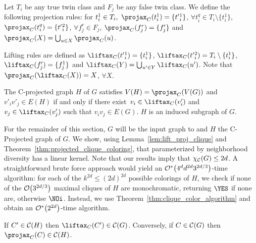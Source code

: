 \begin{definition}
    Let $T_i$ be any true twin class and $F_j$ be any false twin class.
    We define the following projection rules:
    for $t_i^1 \in T_i,\ \Proj{C}(t_i^1) = \{t'{_i^1}\}$,
    $\forall t_i^q \in T_i \setminus \{t_i^1\}$, $\Proj{C}(t_i^q) = \{t'{_i^2}\}$,
    $\forall f_j^r \in F_j$, $\Proj{C}(f_j^r) = \{f'_j\}$
    and $\Proj{C}(X) = \bigcup_{u \in X} \Proj{C}(u)$.
    
    Lifting rules are defined as $\Lift{C}(t'{_i^1}) = \{t_i^1\}$,
    $\Lift{C}(t'{_i^2}) = T_i \setminus \{t_i^1\}$,
    $\Lift{C}(f'_j) = \{f_j^1\}$ and $\Lift{C}(Y) = \bigcup_{u' \in Y} \Lift{C}(u')$.
    Note that $\Proj{C}(\Lift{C}(X)) = X$, $\forall X$.
\end{definition}

\begin{definition}
    The C-projected graph $H$ of $G$ satisfies $V(H) = \Proj{C}(V(G))$ and $v'_iv'_j \in E(H)$ if and only if there exist~$v_i \in \Lift{C}(v'_i)$ and $v_j \in \Lift{C}(v'_j)$ such that $v_iv_j \in E(G)$. $H$ is an induced subgraph of $G$.
\end{definition}


For the remainder of this section, $G$ will be the input graph to  and $H$ the C-Projected graph of $G$.
We show, using Lemma~\ref{lem:lift_proj_clique} and Theorem~\ref{thm:projected_clique_coloring}, that  parameterized by neighborhood diversity has a linear kernel.
Note that our results imply that $\chi_{\mathcal{C}}(G) \leq 2d$.
A straightforward brute force approach would yield an $\mathcal{O}^*\!\left(4^dd^{2d}3^{2d/3}\right)$-time algorithm: for each of the $k^{2d} \leq (2d)^{2d}$ possible colorings of $H$, we check if none of the $\mathcal{O}\!\left(3^{2d/3}\right)$ maximal cliques of $H$ are monochromatic, returning $\YES$ if none are, otherwise $\NOi$.
Instead, we use Theorem~\ref{thm:clique_color_algorithm} and obtain an $\mathcal{O}^*\!\left(2^{2d}\right)$-time algorithm.


\begin{lemma}
    \label{lem:lift_proj_clique}
    If $C' \in \mathcal{C}(H)$ then $\Lift{C}(C') \in \clq(G)$. Conversely, if $C \in \mathcal{C}(G)$ then $\Proj{C}(C) \in \clq(H)$.
\end{lemma}


